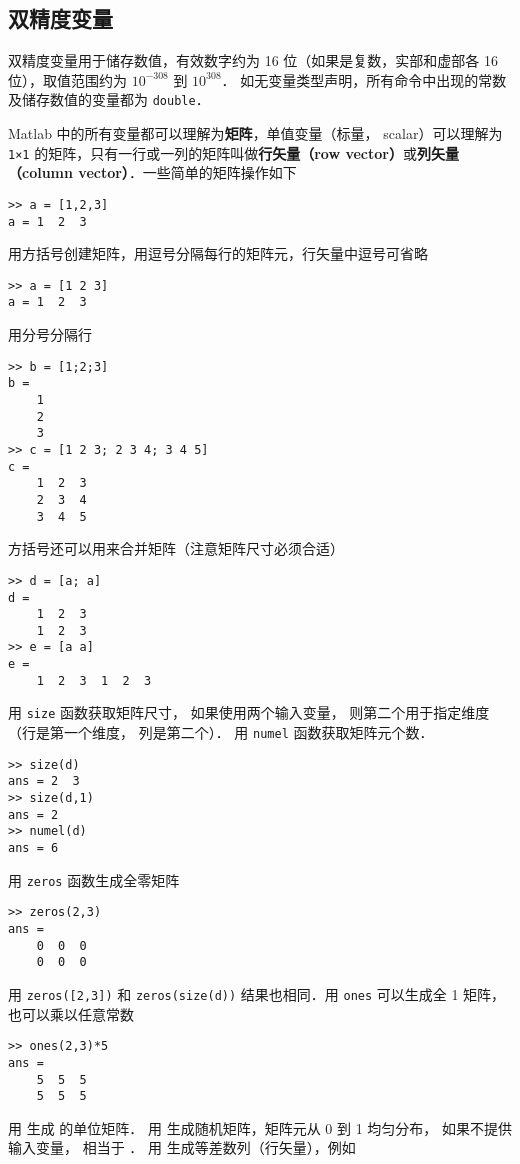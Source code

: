 \subsection{双精度变量}

双精度变量用于储存数值，有效数字约为 16 位（如果是复数，实部和虚部各 16 位），取值范围约为 $10^{-308}$ 到 $10^{308}$． 如无变量类型声明，所有命令中出现的常数及储存数值的变量都为 \lstinline|double|．

Matlab 中的所有变量都可以理解为\textbf{矩阵}，单值变量（标量， scalar）可以理解为 \lstinline|1×1| 的矩阵，只有一行或一列的矩阵叫做\textbf{行矢量（row vector）}或\textbf{列矢量（column vector）}．一些简单的矩阵操作如下
\begin{lstlisting}[language=MatlabCom]
>> a = [1,2,3]
a = 1  2  3
\end{lstlisting}
用方括号创建矩阵，用逗号分隔每行的矩阵元，行矢量中逗号可省略%
\begin{lstlisting}[language=MatlabCom]
>> a = [1 2 3]
a = 1  2  3
\end{lstlisting}
用分号分隔行
\begin{lstlisting}[language=MatlabCom]
>> b = [1;2;3]
b =
    1
    2
    3
>> c = [1 2 3; 2 3 4; 3 4 5]
c =
    1  2  3
    2  3  4
    3  4  5
\end{lstlisting}
方括号还可以用来合并矩阵（注意矩阵尺寸必须合适）
\begin{lstlisting}[language=MatlabCom]
>> d = [a; a]
d =
    1  2  3
    1  2  3
>> e = [a a]
e =
    1  2  3  1  2  3
\end{lstlisting}
用 \lstinline|size| 函数获取矩阵尺寸， 如果使用两个输入变量， 则第二个用于指定维度（行是第一个维度， 列是第二个）． 用 \lstinline|numel| 函数获取矩阵元个数．
\begin{lstlisting}[language=MatlabCom]
>> size(d)
ans = 2  3
>> size(d,1)
ans = 2
>> numel(d)
ans = 6
\end{lstlisting}
用 \lstinline|zeros| 函数生成全零矩阵
\begin{lstlisting}[language=MatlabCom]
>> zeros(2,3)
ans =
    0  0  0
    0  0  0
\end{lstlisting}
用 \lstinline|zeros([2,3])| 和 \lstinline|zeros(size(d))| 结果也相同．用 \lstinline|ones| 可以生成全 1 矩阵，也可以乘以任意常数
\begin{lstlisting}[language=MatlabCom]
>> ones(2,3)*5
ans =
    5  5  5
    5  5  5
\end{lstlisting}
用  生成  的单位矩阵． 用  生成随机矩阵，矩阵元从 0 到 1 均匀分布， 如果不提供输入变量，  相当于 ． 用  生成等差数列（行矢量），例如
